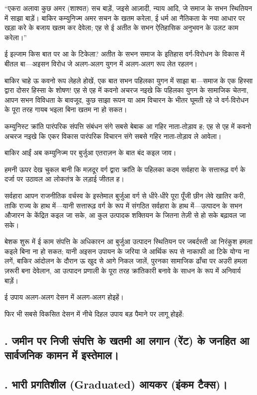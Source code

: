 \documentclass[12pt,a4paper,oneside]{book}
\begin{document}
“एकरा अलावा कुछ अमर (शाश्वत) सच बाड़ें, जइसे आज़ादी, न्याय आदि, जे समाज के सभन स्थितियन में साझा बाड़ें। बाकिर कम्युनिज्म अमर सचन के खतम करेला, ई धर्म आ नैतिकता के नया आधार पर खड़ा करे के बजाय खतम कर देवेला; एह से ई अतीत के सभन ऐतिहासिक अनुभवन के उलट काम करेला।”

ई इल्जाम किस बात पर आ के टिकेला? अतीत के सभन समाज के इतिहास वर्ग-विरोधन के विकास में बीतल बा—अइसन विरोध जे अलग-अलग युगन में अलग-अलग रूप लेत रहलन।

बाकिर चाहे ऊ कवनो रूप लेहले होखें, एक बात सभन पहिलका युगन में साझा बा—समाज के एक हिस्सा द्वारा दोसर हिस्सा के शोषण! एह से एह में कवनो अचरज नइखे कि पहिलका युगन के सामाजिक चेतना, आपन सभन विविधता के बावजूद, कुछ साझा रूपन या आम विचारन के भीतर घूमती रहे जे वर्ग-विरोधन के पूरा तरह गायब भइला बिना खतम ना हो सकत।

कम्युनिस्ट क्रांति पारंपरिक संपत्ति संबंधन संगे सबसे बेबाक आ गहिर नाता-तोड़ाव ह; एह से एह में कवनो अचरज नइखे कि एकर विकास पारंपरिक विचारन संगे सबसे गहिर नाता-तोड़ाव ले आवेला।

बाकिर आईं अब कम्युनिज्म पर बुर्जुआ एतराज़न के बात बंद कइल जाव।

हमनी ऊपर देख चुकल बानी कि मज़दूर वर्ग द्वारा क्रांति के पहिलका कदम सर्वहारा के सत्तारूढ़ वर्ग के दर्जा पर उठावल आ लोकतंत्र के लड़ाई जीतल ह।

सर्वहारा आपन राजनीतिक वर्चस्व के इस्तेमाल बुर्जुआ वर्ग से धीरे-धीरे पूरा पूँजी छीन लेवे खातिर करी, ताकि राज्य के हाथ में—यानी सत्तारूढ़ वर्ग के रूप में संगठित सर्वहारा के हाथ में—उत्पादन के सभन औजारन के केंद्रित कइल जा सके, आ कुल उत्पादक शक्तियन के जितना तेज़ी से हो सके बढ़ावल जा सके।

बेशक शुरू में ई काम संपत्ति के अधिकारन आ बुर्जुआ उत्पादन स्थितियन पर जबर्दस्ती आ निरंकुश हमला कइले बिना ना हो सकत; यानी अइसन उपायन के जरिया जे आर्थिक रूप से नाकाफी आ टिके योग्य ना लगें, बाकिर आंदोलन के दौरान ऊ खुद से आगे निकल जालें, पुरनका सामाजिक ढाँचा पर अउरी हमला ज़रूरी बना देवेलान, आ उत्पादन प्रणाली के पूरा तरह क्रांतिकारी बनावे के साधन के रूप में अनिवार्य बाड़ें।

ई उपाय अलग-अलग देसन में अलग-अलग होइहें।

फिर भी सबसे विकसित देसन में नीचे दिहल उपाय बड़ पैमाने पर लागू होइहें:


\subsection*{{}. जमीन पर निजी संपत्ति के खतमी आ लगान (रेंट) के जनहित आ सार्वजनिक कामन में इस्तेमाल।}

\subsection*{{}. भारी प्रगतिशील {\engfont (Graduated)} आयकर (इंकम टैक्स)।}
\end{document}
